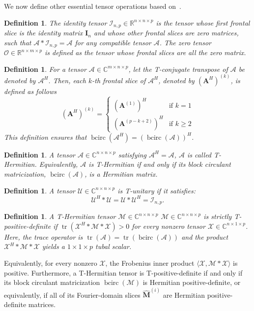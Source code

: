 \documentclass[pdflatex,sn-mathphys-ay]{sn-jnl}
\newcommand{\T}[1]{\mathcal{#1}}    %
\newcommand{\M}[1]{\bm{#1}}     %
\newcommand{\C}{\mathbb{C}}         %
\newcommand{\R}{\mathbb{R}}         %
\newcommand{\tr}{\operatorname{tr}}
\newcommand{\bcirc}{\operatorname{bcirc}}
\theoremstyle{thmstyleone}
\theoremstyle{thmstyletwo}
\theoremstyle{thmstylethree}
\newtheorem{definition}[theorem]{Definition}
\numberwithin{equation}{section}
\begin{document}
We now define other essential tensor operations  based on~\cite{ju2025geometric}. 
\begin{definition}
The \emph{identity tensor} $\T{I}_{n,p} \in \R^{n \times n \times p}$ is the tensor whose first frontal slice is the identity matrix $\M{I}_n$ and whose other frontal slices are zero matrices, such that $\T{A} * \T{I}_{n,p} = \T{A}$ for any compatible tensor $\T{A}$.
The \emph{zero tensor} $\T{O} \in \R^{n\times m\times p}$ is defined as the tensor whose frontal slices are all the zero matrix.
\end{definition}


\begin{definition}
For a tensor $\T{A}\in \C^{m\times n\times p}$, let the \emph{T-conjugate transpose} of $\T{A}$ be denoted by $\T{A}^H$.
Then, each $k$-th frontal slice of $\T{A}^H$, denoted by $(\M{A}^H)^{(k)}$, is defined as follows
$$
(\M{A}^H)^{(k)} =
\begin{cases}
(\M{A}^{(1)})^H & \text{if } k=1 \\
(\M{A}^{(p-k+2)})^H & \text{if } k \ge 2
\end{cases}
$$
This definition ensures that $\bcirc(\T{A}^H) = (\bcirc(\T{A}))^H$.
\end{definition}

\begin{definition}
A tensor $\T{A} \in \C^{n \times n \times p}$ satisfying $\T{A}^H = \T{A}$, $\T{A}$ is called \emph{T-Hermitian}.
Equivalently, $\T{A}$ is T-Hermitian if and only if its block circulant matricization, $\bcirc(\T{A})$, is a Hermitian matrix.
\end{definition}

\begin{definition}
A tensor $\T{U} \in \C^{n \times n \times p}$ is \emph{T-unitary} if it satisfies:
$$ \T{U}^H * \T{U} = \T{U} * \T{U}^H = \T{I}_{n,p}. $$
\end{definition}

\begin{definition}
A T-Hermitian tensor $\T{M} \in \C^{n \times n \times p}$ $\mathcal{M} \in \mathbb{C}^{n \times n \times p}$ is strictly \emph{T-positive-definite} if $\tr(\T{X}^H * \T{M} * \T{X}) > 0$ for every nonzero tensor $\T{X} \in \C^{n \times 1 \times p}$.
Here, the trace operator is $\tr(\T{A}) = \tr(\bcirc(\T{A}))$ and the product $\T{X}^H * \T{M} * \T{X}$ yields a $1 \times 1 \times p$ tubal scalar.
\end{definition}
Equivalently, for every nonzero $\T{X}$, the Frobenius inner product $\langle \T{X}, \T{M} * \T{X} \rangle$ is positive. 
Furthermore, a T-Hermitian tensor is T-positive-definite if and only if its block circulant matricization $\bcirc(\T{M})$ is Hermitian positive-definite, or equivalently, if all of its Fourier-domain slices $\widehat{\M{M}}^{(i)}$ are Hermitian positive-definite matrices.
\end{document}
